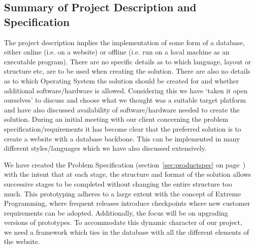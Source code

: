 \subsection{Summary of Project Description and Specification}

The project description implies the implementation of some form of a database, either online (i.e. on a website) or offline (i.e. run on a local machine as an executable program). There are no specific details as to which language, layout or structure etc, are to be used when creating the solution. There are also no details as to which Operating System the solution should be created for and whether additional software/hardware is allowed. Considering this we have ‘taken it open ourselves’ to discuss and choose what we thought was a suitable target platform and have also discussed availability of software/hardware needed to create the solution.
During an initial meeting with our client concerning the problem specification/requirements it has become clear that the preferred solution is to create a website with a database backbone. This can be implemented in many different styles/languages which we have also discussed extensively.
 
We have created the Problem Specification (section~\ref{sec:productspec} on page~\pageref{sec:productspec})
 with the intent that at each stage, the structure and format of the solution allows successive stages to be completed without changing the entire structure too much. This prototyping adheres to a large extent with the concept of Extreme Programming, where frequent releases introduce checkpoints where new customer requirements can be adopted. Additionally, the focus will be on upgrading versions of prototypes. To accommodate this dynamic character of our project, we need a framework which ties in the database with all the different elements of the website.

